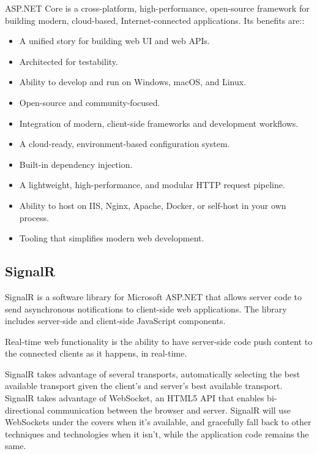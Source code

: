 ASP.NET Core is a cross-platform, high-performance, open-source framework for building modern, cloud-based, Internet-connected applications. Its benefits are:\cite{asp-dotnet-core-description}:
\begin{itemize}
	\item A unified story for building web UI and web APIs.
	\item Architected for testability.
	\item Ability to develop and run on Windows, macOS, and Linux.
	\item Open-source and community-focused.
	\item Integration of modern, client-side frameworks and development workflows.
	\item A cloud-ready, environment-based configuration system.
	\item Built-in dependency injection.
	\item A lightweight, high-performance, and modular HTTP request pipeline.
	\item Ability to host on IIS, Nginx, Apache, Docker, or self-host in your own process.
	\item Tooling that simplifies modern web development.
\end{itemize}

\subsection{SignalR}
\label{chap:04:02:02}

SignalR is a software library for Microsoft ASP.NET that allows server code to send asynchronous notifications to client-side web applications. The library includes server-side and client-side JavaScript components.\cite{signalR-description}

Real-time web functionality is the ability to have server-side code push content to the connected clients as it happens, in real-time.\cite{signalR-description}

SignalR takes advantage of several transports, automatically selecting the best available transport given the client's and server's best available transport. SignalR takes advantage of WebSocket, an HTML5 API that enables bi-directional communication between the browser and server. SignalR will use WebSockets under the covers when it's available, and gracefully fall back to other techniques and technologies when it isn't, while the application code remains the same.\cite{signalR-description}

